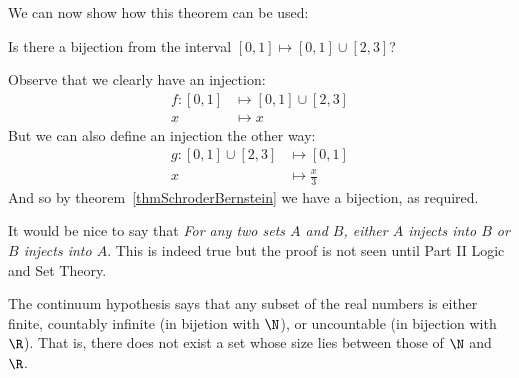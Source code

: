\documentclass[../Main.tex]{subfiles}
\begin{document}
We can now show how this theorem can be used:
\begin{example}
    Is there a bijection from the interval $[0, 1] \mapsto [0, 1] \cup [2, 3]$?\par
    Observe that we clearly have an injection:
    \begin{align*}
        f : [0, 1] &\mapsto [0, 1] \cup [2, 3] \\
        x &\mapsto x
    \end{align*}
    But we can also define an injection the other way:
    \begin{align*}
        g : [0, 1] \cup [2, 3] &\mapsto [0, 1] \\
        x &\mapsto \frac{x}{3}
    \end{align*}
    And so by theorem~\ref{thmSchroderBernstein} we have a bijection, as required.
\end{example}
\begin{remarks}
    \item It would be nice to say that \textit{For any two sets $A$ and $B$, either $A$ injects into $B$ or $B$ injects into $A$}. This is indeed true but the proof is not seen until Part II Logic and Set Theory.
    \item The continuum hypothesis says that any subset of the real numbers is either finite, countably infinite (in bijetion with $\N$), or uncountable (in bijection with $\R$). That is, there does not exist a set whose size lies between those of $\N$ and $\R$.
\end{remarks}
\end{document}
